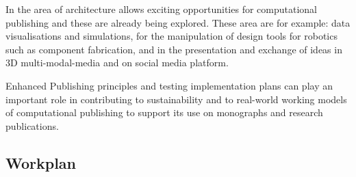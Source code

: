 \documentclass{article}
\begin{document}
In the area of architecture allows exciting opportunities for computational publishing and these are already being explored. These area are for example: data visualisations and simulations, for the manipulation of design tools for robotics such as component fabrication, and in the presentation and exchange of ideas in 3D multi-modal-media and on social media platform.


Enhanced Publishing principles and testing implementation plans can play an important role in contributing to sustainability and to real-world working models of computational publishing to support its use on monographs and research publications.


\subsection{Workplan}\label{H819867}
\end{document}
